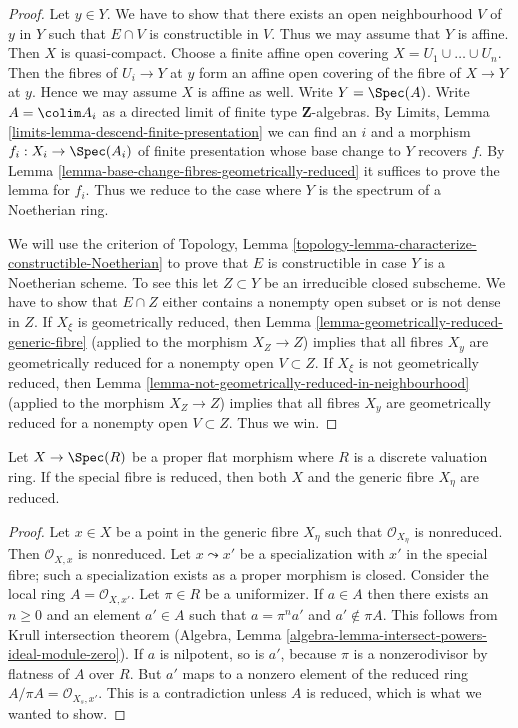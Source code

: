 \begin{proof}
Let $y \in Y$. We have to show that there exists an open neighbourhood
$V$ of $y$ in $Y$ such that $E \cap V$ is constructible in $V$. Thus we may
assume that $Y$ is affine. Then $X$ is quasi-compact.
Choose a finite affine open covering $X = U_1 \cup \ldots \cup U_n$.
Then the fibres of $U_i \to Y$ at $y$ form an affine open covering
of the fibre of $X \to Y$ at $y$. Hence we may assume $X$ is affine
as well.  Write $Y = \Spec(A)$.
Write $A = \colim A_i$ as a directed limit of finite type
$\mathbf{Z}$-algebras. By
Limits, Lemma \ref{limits-lemma-descend-finite-presentation}
we can find an $i$ and a morphism $f_i : X_i \to \Spec(A_i)$ of
finite presentation whose base change to $Y$ recovers $f$. By
Lemma \ref{lemma-base-change-fibres-geometrically-reduced}
it suffices to prove the lemma for $f_i$. Thus we reduce to
the case where $Y$ is the spectrum of a Noetherian ring.

\medskip\noindent
We will use the criterion of
Topology, Lemma \ref{topology-lemma-characterize-constructible-Noetherian}
to prove that $E$ is constructible in case $Y$ is a Noetherian scheme.
To see this let $Z \subset Y$ be an irreducible closed subscheme.
We have to show that $E \cap Z$ either contains a nonempty open subset
or is not dense in $Z$. If $X_\xi$ is geometrically reduced, then
Lemma \ref{lemma-geometrically-reduced-generic-fibre}
(applied to the morphism $X_Z \to Z$)
implies that all fibres $X_y$ are geometrically reduced
for a nonempty open $V \subset Z$.
If $X_\xi$ is not geometrically reduced, then
Lemma \ref{lemma-not-geometrically-reduced-in-neighbourhood}
(applied to the morphism $X_Z \to Z$)
implies that all fibres $X_y$ are geometrically reduced
for a nonempty open $V \subset Z$. Thus we win.
\end{proof}

\begin{lemma}
\label{lemma-proper-flat-over-dvr-reduced-fibre}
Let $X \to \Spec(R)$ be a proper flat morphism where $R$ is a
discrete valuation ring. If the special fibre is reduced, then
both $X$ and the generic fibre $X_\eta$ are reduced.
\end{lemma}

\begin{proof}
Let $x \in X$ be a point in the generic fibre $X_\eta$
such that $\mathcal{O}_{X_\eta}$ is nonreduced.
Then $\mathcal{O}_{X, x}$ is nonreduced.
Let $x \leadsto x'$ be a specialization with $x'$
in the special fibre; such a specialization exists
as a proper morphism is closed. Consider the local
ring $A = \mathcal{O}_{X, x'}$. Let $\pi \in R$ be a uniformizer.
If $a \in A$ then there exists an $n \geq 0$ and an element
$a' \in A$ such that $a = \pi^n a'$ and $a' \not \in \pi A$.
This follows from Krull intersection theorem
(Algebra, Lemma \ref{algebra-lemma-intersect-powers-ideal-module-zero}).
If $a$ is nilpotent, so is $a'$, because $\pi$ is a nonzerodivisor
by flatness of $A$ over $R$.
But $a'$ maps to a nonzero element of the reduced ring
$A/\pi A = \mathcal{O}_{X_s, x'}$.
This is a contradiction unless $A$ is reduced, which
is what we wanted to show.
\end{proof}

